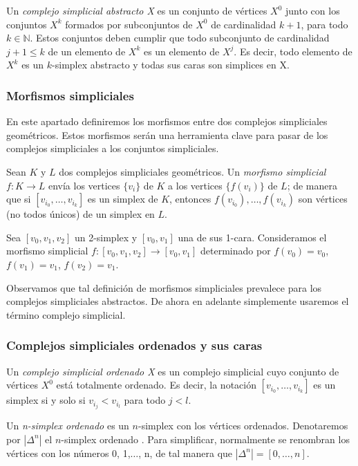\documentclass[../main.tex]{subfiles}
\begin{document}
\begin{defi}
    Un \emph{complejo simplicial abstracto X} es un conjunto de v\'ertices $X^0$ junto con los conjuntos $X^k$ formados por subconjuntos de $X^0$ de cardinalidad $k+1$, para todo $k\in\mathbb{N}$.
    Estos conjuntos deben cumplir que todo subconjunto de cardinalidad $j+1\le k$ de un elemento de $X^k$ es un elemento de $X^j$. Es decir, todo elemento de $X^k$ es un $k$-simplex abstracto y todas sus caras son simplices en X.
\end{defi}




\subsubsection{Morfismos simpliciales}
En este apartado definiremos los morfismos entre dos complejos simpliciales geom\'etricos. Estos morfismos ser\'an una herramienta clave para pasar de los complejos simpliciales a los conjuntos simpliciales.
\begin{defi}
    Sean $K$ y $L$ dos complejos simpliciales geom\'etricos. Un \emph{morfismo simplicial} $f\colon K \to L$ env\'ia los vertices $\{v_i\}$ de $K$ a los vertices $\{f(v_i)\}$ de $L$; de manera que si $[v_{i_0},\dots,v_{i_k}]$ es un simplex de $K$, entonces $f(v_{i_0}),\dots,f(v_{i_k})$ son v\'ertices (no todos \'unicos) de un simplex en $L$.
\end{defi}
\begin{ex}
    Sea $[v_0,v_1,v_2]$ un 2-simplex y $[v_0,v_1]$ una de sus 1-cara. Consideramos el morfismo simplicial $f\colon[v_0,v_1,v_2]\to[v_0,v_1]$ determinado por $f(v_0)=v_0$, $f(v_1)=v_1$, $f(v_2)=v_1$. 
\end{ex}

Observamos que tal definici\'on de morfismos simpliciales prevalece para los complejos simpliciales abstractos. De ahora en adelante simplemente usaremos el t\'ermino complejo simplicial.

\subsubsection{Complejos simpliciales ordenados y sus caras}
\begin{defi}
    Un \emph{complejo simplicial ordenado X} es un complejo simplicial cuyo conjunto de v\'ertices $X^0$ est\'a totalmente ordenado. Es decir, la notaci\'on $[v_{i_0},\dots,v_{i_k}]$ es un simplex si y solo si $v_{i_j} < v_{i_l}$ para todo $j<l$.
\end{defi}
\begin{defi}
    Un \emph{n-simplex ordenado} es un $n$-simplex con los v\'ertices ordenados. Denotaremos por $|\Delta^n|$ el $n$-simplex ordenado . Para simplificar, normalmente se renombran los v\'ertices con los n\'umeros 0, 1,$\dots$, n, de tal manera que $|\Delta^n|=[0,\dots,n]$.
\end{defi}
\end{document}
